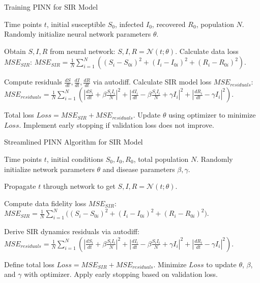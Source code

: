 \documentclass[12pt, letterpaper]{report}
\begin{document}
\begin{algorithm}
\caption{Training PINN for SIR Model}
\begin{algorithmic}[1]

\Require Time points $t$, initial susceptible $S_0$, infected $I_0$, recovered $R_0$, population $N$.
\State Randomly initialize neural network parameters $\theta$.

    \State Obtain $S, I, R$ from neural network: $S, I, R = \mathcal{N}(t; \theta)$.
    \State Calculate data loss $MSE_{SIR}$:
    \State $MSE_{SIR} = \frac{1}{N}\sum_{i=1}^{N} ((S_i - S_{0i})^2 + (I_i - I_{0i})^2 + (R_i - R_{0i})^2)$.
    
    \State Compute residuals $\frac{dS}{dt}, \frac{dI}{dt}, \frac{dR}{dt}$ via autodiff.
    \State Calculate SIR model loss $MSE_{residuals}$:
    \State $MSE_{residuals} = \frac{1}{N}\sum_{i=1}^{N} \left( \left|\frac{dS_i}{dt} + \beta \frac{S_i I_i}{N}\right|^2 + \left|\frac{dI_i}{dt} - \beta \frac{S_i I_i}{N} + \gamma I_i\right|^2 + \left|\frac{dR_i}{dt} - \gamma I_i\right|^2 \right)$.
    
    \State Total loss $Loss = MSE_{SIR} + MSE_{residuals}$.
    \State Update $\theta$ using optimizer to minimize $Loss$.
    \State Implement early stopping if validation loss does not improve.
\EndFor

\end{algorithmic}
\end{algorithm}

\begin{algorithm}
\caption{Streamlined PINN Algorithm for SIR Model}
\begin{algorithmic}[1]

\Require Time points $t$, initial conditions $S_0, I_0, R_0$, total population $N$.
\State Randomly initialize network parameters $\theta$ and disease parameters $\beta, \gamma$.

    \State Propagate $t$ through network to get $S, I, R = \mathcal{N}(t; \theta)$.
    
    \State Compute data fidelity loss $MSE_{SIR}$:
    \State $MSE_{SIR} = \frac{1}{N}\sum_{i=1}^{N} \big((S_i - S_{0i})^2 + (I_i - I_{0i})^2 + (R_i - R_{0i})^2\big)$.
    
    \State Derive SIR dynamics residuals via autodiff:
    \State $MSE_{residuals} = \frac{1}{N}\sum_{i=1}^{N} \left( \left|\frac{dS_i}{dt} + \beta \frac{S_i I_i}{N}\right|^2 + \left|\frac{dI_i}{dt} - \beta \frac{S_i I_i}{N} + \gamma I_i\right|^2 + \left|\frac{dR_i}{dt} - \gamma I_i\right|^2 \right)$.
    
    \State Define total loss $Loss = MSE_{SIR} + MSE_{residuals}$.
    \State Minimize $Loss$ to update $\theta$, $\beta$, and $\gamma$ with optimizer.
    \State Apply early stopping based on validation loss.
\EndFor

\end{algorithmic}
\end{algorithm}
\end{document}
